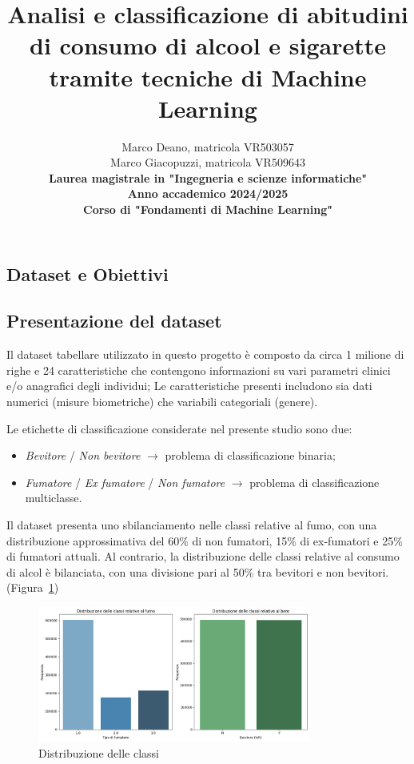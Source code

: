 \documentclass{article}
\title{Analisi e classificazione di abitudini di consumo di alcool e sigarette tramite tecniche di Machine Learning}
\author{%
  Marco Deano, matricola VR503057\\
  Marco Giacopuzzi, matricola VR509643\\[1ex]
  \textbf{Laurea magistrale in "Ingegneria e scienze informatiche"}\\
  \textbf{Anno accademico 2024/2025}\\
  \textbf{Corso di "Fondamenti di Machine Learning"}
}
\date{}
\begin{document}
\maketitle
\tableofcontents
\newpage

\begin{multicols}{2}

\section{Dataset e Obiettivi}

\subsection{Presentazione del dataset}

Il dataset tabellare utilizzato in questo progetto è composto da circa 1 milione di righe e 24 caratteristiche che contengono informazioni su vari parametri clinici e/o anagrafici degli individui; Le caratteristiche presenti includono sia dati numerici (misure biometriche) che variabili categoriali (genere).~\cite{sooyoungher_smoking_drinking}

Le etichette di classificazione considerate nel presente studio sono due:

\begin{itemize}[leftmargin=*]
    \item \textit{Bevitore} / \textit{Non bevitore} $\rightarrow$ problema di classificazione binaria;
    \item \textit{Fumatore} / \textit{Ex fumatore} / \textit{Non fumatore} $\rightarrow$ problema di classificazione multiclasse.
\end{itemize}

Il dataset presenta uno sbilanciamento nelle classi relative al fumo, con una distribuzione approssimativa del 60\% di non fumatori, 15\% di ex-fumatori e 25\% di fumatori attuali.
Al contrario, la distribuzione delle classi relative al consumo di alcol è bilanciata, con una divisione pari al 50\% tra bevitori e non bevitori. (Figura~\ref{fig:class_distribution})

\begin{figure}[!htb] %
  \centering
  \includegraphics[width=0.8\textwidth]{screen_results/classes_distribution.png}
  \caption{Distribuzione delle classi}
  \label{fig:class_distribution}
\end{figure}


\end{multicols}
\end{document}
